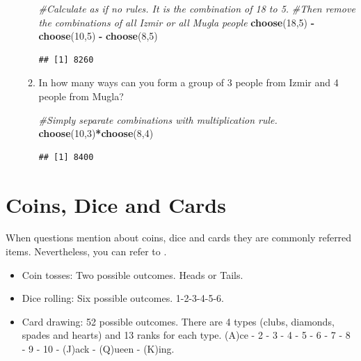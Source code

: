\documentclass[]{book}
\newenvironment{Shaded}{\begin{snugshade}}{\end{snugshade}}
\newcommand{\CommentTok}[1]{\textcolor[rgb]{0.56,0.35,0.01}{\textit{#1}}}
\newcommand{\DecValTok}[1]{\textcolor[rgb]{0.00,0.00,0.81}{#1}}
\newcommand{\KeywordTok}[1]{\textcolor[rgb]{0.13,0.29,0.53}{\textbf{#1}}}
\newcommand{\NormalTok}[1]{#1}
\newcommand{\OperatorTok}[1]{\textcolor[rgb]{0.81,0.36,0.00}{\textbf{#1}}}
\newcommand{\StringTok}[1]{\textcolor[rgb]{0.31,0.60,0.02}{#1}}
\providecommand{\tightlist}{%
  \setlength{\itemsep}{0pt}\setlength{\parskip}{0pt}}
\theoremstyle{definition}
\theoremstyle{definition}
\theoremstyle{definition}
\theoremstyle{remark}
\begin{document}
\begin{itemize}
\begin{enumerate}
\begin{Shaded}
\begin{Highlighting}[]
\CommentTok{#Calculate as if no rules. It is the combination of 18 to 5.}
\CommentTok{#Then remove the combinations of all Izmir or all Mugla people}
\KeywordTok{choose}\NormalTok{(}\DecValTok{18}\NormalTok{,}\DecValTok{5}\NormalTok{) }\OperatorTok{-}\StringTok{ }\KeywordTok{choose}\NormalTok{(}\DecValTok{10}\NormalTok{,}\DecValTok{5}\NormalTok{) }\OperatorTok{-}\StringTok{ }\KeywordTok{choose}\NormalTok{(}\DecValTok{8}\NormalTok{,}\DecValTok{5}\NormalTok{)}
\end{Highlighting}
\end{Shaded}

\begin{verbatim}
## [1] 8260
\end{verbatim}
  \item
    In how many ways can you form a group of 3 people from Izmir and 4
    people from Mugla?

\begin{Shaded}
\begin{Highlighting}[]
\CommentTok{#Simply separate combinations with multiplication rule.}
\KeywordTok{choose}\NormalTok{(}\DecValTok{10}\NormalTok{,}\DecValTok{3}\NormalTok{)}\OperatorTok{*}\KeywordTok{choose}\NormalTok{(}\DecValTok{8}\NormalTok{,}\DecValTok{4}\NormalTok{)}
\end{Highlighting}
\end{Shaded}

\begin{verbatim}
## [1] 8400
\end{verbatim}
  \end{enumerate}
\end{itemize}

\hypertarget{coins-dice-and-cards}{%
\section{Coins, Dice and Cards}\label{coins-dice-and-cards}}

When questions mention about coins, dice and cards they are commonly
referred items. Nevertheless, you can refer to .

\begin{itemize}
\tightlist
\item
  Coin tosses: Two possible outcomes. Heads or Tails.
\item
  Dice rolling: Six possible outcomes. 1-2-3-4-5-6.
\item
  Card drawing: 52 possible outcomes. There are 4 types (clubs,
  diamonds, spades and hearts) and 13 ranks for each type. (A)ce - 2 - 3
  - 4 - 5 - 6 - 7 - 8 - 9 - 10 - (J)ack - (Q)ueen - (K)ing.
\end{itemize}
\end{document}
